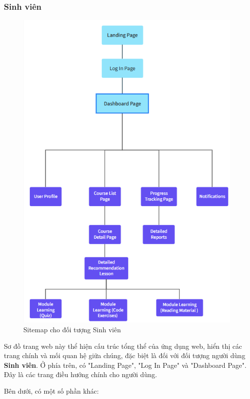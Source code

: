 \subsubsection{Sinh viên}
\begin{figure}[H]
    \centering
    \includegraphics[scale=0.8]{Images/sitemap/Student.png}
    \caption{Sitemap cho đối tượng Sinh viên}
    \label{fig:enter-label}
\end{figure}
\par Sơ đồ trang web này thể hiện cấu trúc tổng thể của ứng dụng web, hiển thị các trang chính và mối quan hệ giữa chúng, đặc biệt là đối với đối tượng người dùng \textbf{Sinh viên}. Ở phía trên, có "Landing Page", "Log In Page" và "Dashboard Page". Đây là các trang điều hướng chính cho người dùng.
\par Bên dưới, có một số phần khác:

